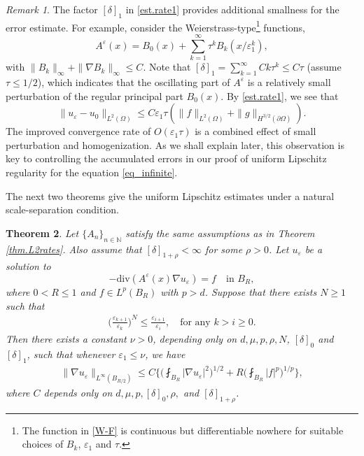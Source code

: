 \documentclass[reqno,12pt]{amsart} %
\newtheorem{theorem}{Theorem}[section]
\theoremstyle{definition}
\theoremstyle{remark}
\newtheorem{remark}[theorem]{Remark}
\numberwithin{equation}{section}
\newcommand{\N}{\mathbb{N}}
\newcommand{\e}{\varepsilon}
\begin{document}
\begin{remark}
    The factor $[\delta]_1$ in \eqref{est.rate1} provides additional smallness for the error estimate. For example, consider the Weierstrass-type\footnote{The function in \eqref{W-F} is 
    continuous but differentiable nowhere for suitable choices of $B_k$, $\e_1$ and $\tau$.} functions,
    \begin{equation}\label{W-F}
        A^\e(x) = B_0(x) + \sum_{k =1}^\infty \tau^k B_k(x/\e_1^k),
    \end{equation}
    with $\| B_k\|_\infty + \| \nabla  B_k \|_\infty \le C$.
    Note that  $[\delta]_1 = \sum_{k=1}^\infty C k \tau^k \le C \tau $ (assume $\tau \le 1/2$), which indicates that the oscillating part of $A^\e$ is a relatively small perturbation of the regular principal part $B_0(x)$. By \eqref{est.rate1}, we see that 
    \[
    \|u_\varepsilon-u_0\|_{L^2(\Omega)} \le C\e_1 \tau \left(\|f\|_{L^2(\Omega)}+\|g\|_{H^{3/2}(\partial\Omega)}\right).
    \]
    The improved convergence rate of $O(\e_1 \tau)$ is a combined effect of small perturbation and homogenization. As we shall explain later, this observation is key to controlling the accumulated errors in our proof of uniform Lipschitz regularity
    for the equation \eqref{eq_infinite}.
\end{remark}

The next two theorems give the uniform Lipschitz estimates under a natural scale-separation condition.

\begin{theorem}\label{thm.IntLip}
    Let $\{A_n\}_{n\in \N}$ satisfy the same assumptions as in Theorem \ref{thm.L2rates}. Also assume that  $[\delta]_{1+\rho}<\infty$ for some $\rho>0$. Let $u_\varepsilon$ be a solution to 
    \begin{equation*}
        -\mathrm{div}(A^\varepsilon(x)\nabla u_\varepsilon)=f \quad \text{in } B_R,
    \end{equation*}
    where $0<R\leq 1$ and $f\in L^p(B_{R})$ with $p>d$. Suppose that there exists $N \ge 1$ such that
  \begin{align}\label{int-lip_cond_separation_ratio}
    \bigg(\frac{\varepsilon_{k+1}}{\varepsilon_{k}}\bigg)^N\leq \frac{\varepsilon_{i+1}}{\varepsilon_{i}}, \quad \text{for any } k > i \ge 0.
  \end{align}
    Then there exists a constant $\nu>0$, depending only on $d, \mu, p, \rho, N$, $[\delta]_0 $ and $ [\delta]_1$, such that whenever $\varepsilon_1\leq \nu$, we have
  \begin{align}\label{int-lip_es_Lip}
    \| \nabla u_\e \|_{L^\infty(B_{R/2})} \leq C\bigg\{\bigg(\fint_{B_{R}}|\nabla u_\varepsilon|^2\bigg)^{1/2}+R\bigg(\fint_{B_{R}}|f|^p\bigg)^{1/p}\bigg\},
  \end{align}
where $C$ depends only on $d, \mu, p, [\delta]_0, \rho,$ and $ [\delta]_{1+\rho}$.
\end{theorem}
\end{document}
